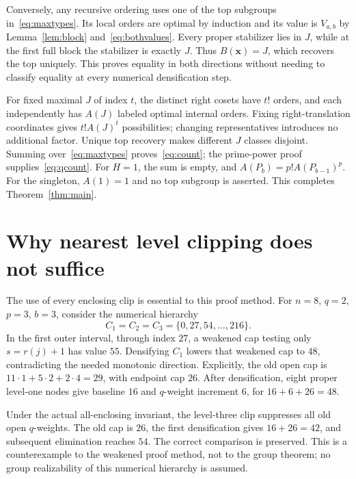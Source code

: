 \documentclass[11pt,letterpaper]{article}
\theoremstyle{definition}\newtheorem{definition}{Definition}
\begin{document}
Conversely, any recursive ordering uses one of the top subgroups in~\eqref{eq:maxtypes}. Its local orders are optimal by induction and its value is $V_{a,b}$ by Lemma~\ref{lem:block} and~\eqref{eq:bothvalues}. Every proper stabilizer lies in $J$, while at the first full block the stabilizer is exactly $J$. Thus $B(\mathbf{x})=J$, which recovers the top uniquely. This proves equality in both directions without needing to classify equality at every numerical densification step.

For fixed maximal $J$ of index $t$, the distinct right cosets have $t!$ orders, and each independently has $A(J)$ labeled optimal internal orders. Fixing right-translation coordinates gives $t!A(J)^t$ possibilities; changing representatives introduces no additional factor. Unique top recovery makes different $J$ classes disjoint. Summing over~\eqref{eq:maxtypes} proves~\eqref{eq:count}; the prime-power proof supplies~\eqref{eq:qcount}. For $H=1$, the sum is empty, and $A(P_b)=p!A(P_{b-1})^p$. For the singleton, $A(1)=1$ and no top subgroup is asserted. This completes Theorem~\ref{thm:main}.

\section{Why nearest level clipping does not suffice}\label{sec:diagnostic}
The use of every enclosing clip is essential to this proof method. For $n=8$, $q=2$, $p=3$, $b=3$, consider the numerical hierarchy
\[
C_1=C_2=C_3=\{0,27,54,\ldots,216\}.
\]
In the first outer interval, through index $27$, a weakened cap testing only $s=r(j)+1$ has value $55$. Densifying $C_1$ lowers that weakened cap to $48$, contradicting the needed monotonic direction. Explicitly, the old open cap is $11\cdot1+5\cdot2+2\cdot4=29$, with endpoint cap $26$. After densification, eight proper level-one nodes give baseline $16$ and $q$-weight increment $6$, for $16+6+26=48$.

Under the actual all-enclosing invariant, the level-three clip suppresses all old open $q$-weights. The old cap is $26$, the first densification gives $16+26=42$, and subsequent elimination reaches $54$. The correct comparison is preserved. This is a counterexample to the weakened proof method, not to the group theorem; no group realizability of this numerical hierarchy is assumed.
\end{document}
